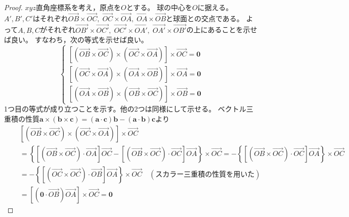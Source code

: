         \begin{proof}
            \quad\par
            $xyz$直角座標系を考え，原点を$O$とする。
            球の中心を$O$に据える。
            $A',B',C'$はそれぞれ$\overrightarrow{OB}\times\overrightarrow{OC},\;\overrightarrow{OC}\times\overrightarrow{OA},\;\overrightarrow{OA}\times\overrightarrow{OB}$と球面との交点である。
            よって$A,B,C$がそれぞれ$\overrightarrow{OB'}\times\overrightarrow{OC'},\;\overrightarrow{OC'}\times\overrightarrow{OA'},\;\overrightarrow{OA'}\times\overrightarrow{OB'}$の上にあることを示せば良い。
            すなわち，次の等式を示せば良い。
            \[
                \begin{cases}
                    \left[(\overrightarrow{OB}\times\overrightarrow{OC})\times(\overrightarrow{OC}\times\overrightarrow{OA})\right]\times\overrightarrow{OC} = \bm{0} \\
                    \left[(\overrightarrow{OC}\times\overrightarrow{OA})\times(\overrightarrow{OA}\times\overrightarrow{OB})\right]\times\overrightarrow{OA} = \bm{0} \\
                    \left[(\overrightarrow{OA}\times\overrightarrow{OB})\times(\overrightarrow{OB}\times\overrightarrow{OC})\right]\times\overrightarrow{OB} = \bm{0}
                \end{cases}
            \]
            1つ目の等式が成り立つことを示す。他の2つは同様にして示せる。
            ベクトル三重積の性質$\bm{a}\times(\bm{b}\times\bm{c}) = (\bm{a}\cdot\bm{c})\bm{b} - (\bm{a}\cdot\bm{b})\bm{c}$より
            \begin{align*}
                &[(\overrightarrow{OB}\times\overrightarrow{OC})\times(\overrightarrow{OC}\times\overrightarrow{OA})]\times\overrightarrow{OC} \\
                \quad &= \left\{\left[(\overrightarrow{OB}\times\overrightarrow{OC})\cdot\overrightarrow{OA}\right]\overrightarrow{OC} - \left[(\overrightarrow{OB}\times\overrightarrow{OC})\cdot\overrightarrow{OC}\right]\overrightarrow{OA}\right\}\times\overrightarrow{OC} = -\left\{\left[(\overrightarrow{OB}\times\overrightarrow{OC})\cdot\overrightarrow{OC}\right]\overrightarrow{OA}\right\}\times\overrightarrow{OC}\\
                \quad &= -\left\{\left[(\overrightarrow{OC}\times\overrightarrow{OC})\cdot\overrightarrow{OB}\right]\overrightarrow{OA}\right\}\times\overrightarrow{OC} \quad (\text{スカラー三重積の性質を用いた}) \\
                \quad &= \left[\left(\bm{0}\cdot{\overrightarrow{OB}}\right)\overrightarrow{OA}\right]\times\overrightarrow{OC} = \bm{0}
            \end{align*}
        \end{proof}

